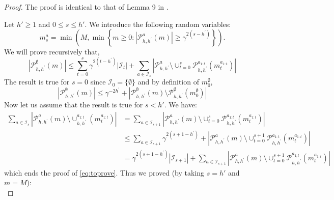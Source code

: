 \documentclass[runningheads]{llncs}
\newcommand{\citep}{\cite}
\begin{document}
\begin{proof}
The proof is identical to that of Lemma 9 in \citep{Bubeck2010}.

\noindent
Let $h'\geq 1$ and $0 \leq s \leq h'$. We introduce the following random variables:
\begin{equation*}
m_{s}^{a}=\min \left(M, \min \left\{m \geq 0 :\left|\mathcal{P}_{h, h^{\prime}}^{a}(m)\right| \geq \gamma^{2\left(s-h^{\prime}\right)}\right\}\right).
\end{equation*}
We will prove recursively that,
\begin{equation}
\label{eq:toprove}
\left|\mathcal{P}_{h, h^{\prime}}^{\emptyset}(m)\right| \leq \sum_{t=0}^{s} \gamma^{2\left(t-h^{\prime}\right)}\left|\mathcal{I}_{t}\right|+\sum_{a \in \mathcal{I}_{s}}\left|\mathcal{P}_{h, h^{\prime}}^{a} \setminus \cup_{t=0}^{s} \mathcal{P}_{h, h^{\prime}}^{a_{1:t}}\left(m_{t}^{a_{1:t}}\right)\right|
\end{equation}
The result is true for $s = 0$ since $\mathcal{I}_0 = \{\emptyset\}$ and by definition of $m^\emptyset_0$,
\begin{equation*}
\left|\mathcal{P}_{h, h^{\prime}}^{\emptyset}(m)\right| \leq \gamma^{-2 h^{\prime}}+\left|\mathcal{P}_{h, h^{\prime}}^{\emptyset}(m) \setminus \mathcal{P}_{h, h^{\prime}}^{\emptyset}\left(m_{0}^{\emptyset}\right)\right|
\end{equation*}
Now let us assume that the result is true for $s<h'$. We have:
\begin{align*}
\sum_{a \in \mathcal{I}_{s}}\left|\mathcal{P}_{h, h^{\prime}}^{a}(m) \setminus \cup_{h, h^{\prime}}^{a_{1 : t}}\left(m_{t}^{a_{1 : t}}\right)\right|&=\sum_{a \in \mathcal{I}_{s+1}}\left|\mathcal{P}_{h, h^{\prime}}^{a}(m) \setminus \cup_{t=0}^{s} \mathcal{P}_{h, h^{\prime}}^{a_{1 : t}}\left(m_{t}^{a_{1 : t}}\right)\right|\\
&\leq \sum_{a \in \mathcal{I}_{s+1}} \gamma^{2\left(s+1-h^{\prime}\right)}+\left|\mathcal{P}_{h, h^{\prime}}^{a}(m) \setminus \cup_{t=0}^{s+1} \mathcal{P}_{h, h^{\prime}}^{a_{1 : t}}\left(m_{t}^{a_{1 : t}}\right)\right|\\
&= \gamma^{2\left(s+1-h^{\prime}\right)}\left|\mathcal{I}_{s+1}\right|+\sum_{a \in \mathcal{I}_{s+1}}\left|\mathcal{P}_{h, h^{\prime}}^{a}(m) \setminus \cup_{t=0}^{s+1} \mathcal{P}_{h, h^{\prime}}^{a_{1 ; t}}\left(m_{t}^{a_{1 : t}}\right)\right|
\end{align*}
which ends the proof of \eqref{eq:toprove}. Thus we proved (by taking $s=h'$ and $m=M$):
\begin{equation*}

\end{equation*}
\end{proof}
\end{document}
